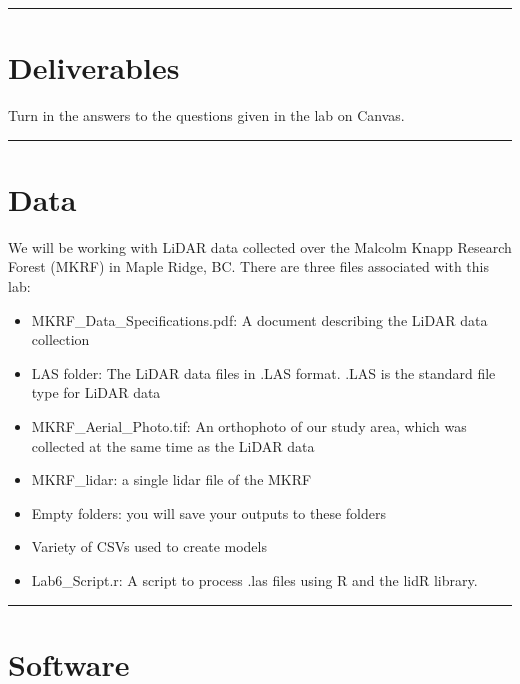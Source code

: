 \documentclass[
]{book}
\providecommand{\tightlist}{%
  \setlength{\itemsep}{0pt}\setlength{\parskip}{0pt}}
\begin{document}
\begin{center}\rule{0.5\linewidth}{0.5pt}\end{center}

\hypertarget{lab3-deliverables}{%
\section*{Deliverables}\label{lab3-deliverables}}

Turn in the answers to the questions given in the lab on Canvas.

\begin{center}\rule{0.5\linewidth}{0.5pt}\end{center}

\hypertarget{data-2}{%
\section*{Data}\label{data-2}}

We will be working with LiDAR data collected over the Malcolm Knapp Research Forest (MKRF) in Maple Ridge, BC. There are three files associated with this lab:

\begin{itemize}
\tightlist
\item
  MKRF\_Data\_Specifications.pdf: A document describing the LiDAR data collection
\item
  LAS folder: The LiDAR data files in .LAS format. .LAS is the standard file type for LiDAR data
\item
  MKRF\_Aerial\_Photo.tif: An orthophoto of our study area, which was collected at the same time as the LiDAR data
\item
  MKRF\_lidar: a single lidar file of the MKRF
\item
  Empty folders: you will save your outputs to these folders
\item
  Variety of CSVs used to create models
\item
  Lab6\_Script.r: A script to process .las files using R and the lidR library.
\end{itemize}

\begin{center}\rule{0.5\linewidth}{0.5pt}\end{center}

\hypertarget{software}{%
\section*{Software}\label{software}}
\end{document}
